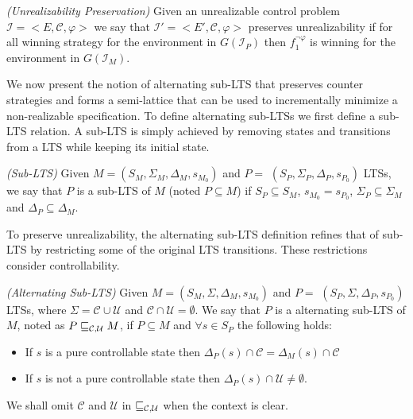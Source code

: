 
\begin{definition}\label{}\emph{(Unrealizability Preservation)}
Given an unrealizable control problem $\mathcal{I} = <E, \mathcal{C}, \varphi>$ we say
that $\mathcal{I'} = <E', \mathcal{C}, \varphi>$ preserves unrealizability
 if for all  winning strategy \counterS for
the environment in $G(\mathcal{I}_P)$ 
then $f_1^{\neg \varphi}$ is winning for the environment in
$G(\mathcal{I}_M)$.
\end{definition}

We now present the notion of alternating sub-LTS that preserves counter strategies and forms a semi-lattice that can be used to incrementally minimize a non-realizable specification. 
To define alternating sub-LTSs we first define a sub-LTS relation.  A sub-LTS is simply achieved by removing states and transitions from a LTS while keeping its initial state.

\begin{definition}\label{def:lts-inclusion}\emph{(Sub-LTS)}
Given $M = (S_M, \Sigma_M, \Delta_M, s_{M_0})$ and
 $P =$ $(S_P,\Sigma_P,\Delta_P,s_{P_0})$ LTSs, 
we say that $P$ is a sub-LTS of $M$ (noted $P \subseteq M$) if $S_P \subseteq S_M$,
$s_{M_0} = s_{P_0}$, $\Sigma_P \subseteq \Sigma_M$ and $\Delta_P \subseteq \Delta_M$.
\end{definition}

To preserve unrealizability, the alternating sub-LTS definition refines that of sub-LTS by restricting some of the original LTS transitions. 
These restrictions consider controllability. 

\begin{definition}\label{def:nonreal-legalEnvironment}\emph{(Alternating Sub-LTS)}
Given $M = (S_M, \Sigma, \Delta_M, s_{M_0})$ and
 $P =$ $(S_P,\Sigma,\Delta_P,s_{P_0})$ LTSs, 
where $\Sigma =\mathcal{C}\cup \mathcal{U}$ and $\mathcal{C}\cap
\mathcal{U}=\emptyset$. We say that $P$ is a alternating
 sub-LTS of $M$, noted as $P \sqsubseteq_{\mathcal{C},\mathcal{U}} M$, if  $P \subseteq M$  and $\forall s \in S_{P}$ the following holds:
 \begin{itemize}
\item If $s$ is a pure controllable state then $\Delta_{P}(s) \cap \mathcal{C} = \Delta_{M}(s) \cap \mathcal{C} $
\item If $s$ is not a pure controllable state then  
$\Delta_{P}(s) \cap \mathcal{U} \neq \emptyset$.
 \end{itemize}
 
We shall omit $\mathcal{C}$ and $\mathcal{U}$ in $\sqsubseteq_{\mathcal{C},\mathcal{U}}$ when the context is clear. 
 \end{definition}

